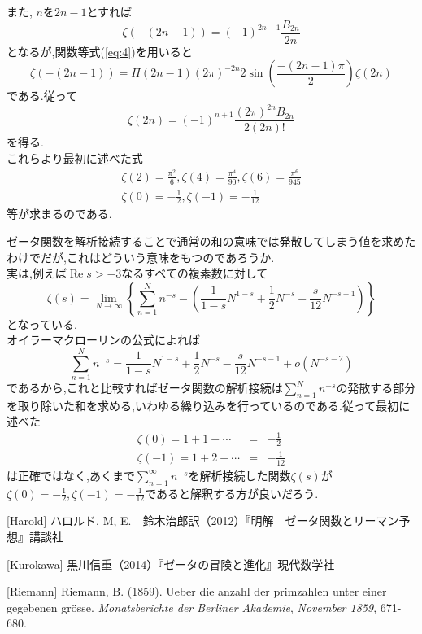 また, $n$を$2n-1$とすれば
\[
\zeta(-(2n-1))=(-1)^{2n-1}\frac{B_{2n}}{2n}
\]
となるが,関数等式(\ref{eq:4})を用いると
\[
\zeta(-(2n-1))=\Pi(2n-1)(2\pi)^{-2n}2\sin\left(\frac{-(2n-1)\pi}{2}\right)\zeta(2n)
\]
である.従って
\[
\zeta(2n)=(-1)^{n+1}\frac{(2\pi)^{2n}B_{2n}}{2(2n)!}
\]
を得る.\\
これらより最初に述べた式
\begin{eqnarray*}
\zeta(2)=\frac{\pi^2}{6}, \zeta(4)=\frac{\pi^4}{90}, \zeta(6)=\frac{\pi^6}{945}\\
\zeta(0)=-\frac{1}{2}, \zeta(-1)=-\frac{1}{12}
\end{eqnarray*}
等が求まるのである.

ゼータ関数を解析接続することで通常の和の意味では発散してしまう値を求めたわけでだが,これはどういう意味をもつのであろうか.\\
実は,例えば$\operatorname{Re} s>-3$なるすべての複素数に対して
\[
\zeta(s)=\lim_{N\to\infty}\left\{\sum_{n=1}^N n^{-s}-\left(\frac{1}{1-s}N^{1-s}+\frac{1}{2}N^{-s}-\frac{s}{12}N^{-s-1}\right)\right\}
\]
となっている.\\
オイラーマクローリンの公式によれば
\[
\sum_{n=1}^N n^{-s}=\frac{1}{1-s}N^{1-s}+\frac{1}{2}N^{-s}-\frac{s}{12}N^{-s-1}+o(N^{-s-2})
\]
であるから,これと比較すればゼータ関数の解析接続は$\sum_{n=1}^N n^{-s}$の発散する部分を取り除いた和を求める,いわゆる繰り込みを行っているのである.従って最初に述べた
\begin{eqnarray*}
\zeta(0)=1+1+\cdots &=& -\frac{1}{2}\\
\zeta(-1)=1+2+\cdots &=& -\frac{1}{12}
\end{eqnarray*}
は正確ではなく,あくまで$\sum_{n=1}^\infty n^{-s}$を解析接続した関数$\zeta(s)$が$\zeta(0)=-\frac{1}{2},\zeta(-1)=-\frac{1}{12}$であると解釈する方が良いだろう.
\begin{description}
\item{[Harold]} ハロルド, M, E.　鈴木治郎訳（2012）『明解　ゼータ関数とリーマン予想』講談社
\item{[Kurokawa]} 黒川信重（2014）『ゼータの冒険と進化』現代数学社
\item{[Riemann]} Riemann, B. (1859). Ueber die anzahl der primzahlen unter einer gegebenen gr\"{o}sse. \textit{Monatsberichte der Berliner Akademie}, \textit{November 1859}, 671-680.
\end{description}

